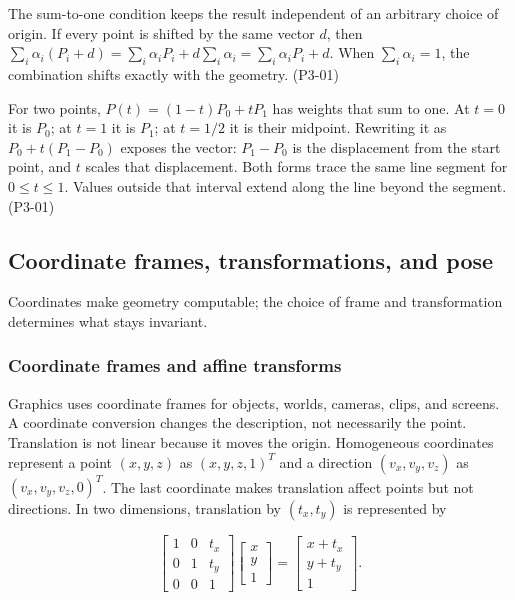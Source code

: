 The sum-to-one condition keeps the result independent of an arbitrary choice of origin. If every point is shifted by the same vector \(d\), then \(\sum_i\alpha_i(P_i+d)=\sum_i\alpha_iP_i+d\sum_i\alpha_i=\sum_i\alpha_iP_i+d\). When \(\sum_i\alpha_i=1\), the combination shifts exactly with the geometry. (P3-01)

For two points, \(P(t)=(1-t)P_0+tP_1\) has weights that sum to one. At \(t=0\) it is \(P_0\); at \(t=1\) it is \(P_1\); at \(t=1/2\) it is their midpoint. Rewriting it as \(P_0+t(P_1-P_0)\) exposes the vector: \(P_1-P_0\) is the displacement from the start point, and \(t\) scales that displacement. Both forms trace the same line segment for \(0\leq t\leq1\). Values outside that interval extend along the line beyond the segment. (P3-01)

\subsection{Coordinate frames, transformations, and pose}\label{coordinate-frames-transformations-and-pose}

Coordinates make geometry computable; the choice of frame and transformation determines what stays invariant.

\subsubsection{Coordinate frames and affine transforms}\label{coordinate-frames-and-affine-transforms}

Graphics uses coordinate frames for objects, worlds, cameras, clips, and screens. A coordinate conversion changes the description, not necessarily the point. Translation is not linear because it moves the origin. Homogeneous coordinates represent a point \((x,y,z)\) as \((x,y,z,1)^T\) and a direction \((v_x,v_y,v_z)\) as \((v_x,v_y,v_z,0)^T\). The last coordinate makes translation affect points but not directions. In two dimensions, translation by \((t_x,t_y)\) is represented by

\[
\begin{bmatrix}1&0&t_x\\0&1&t_y\\0&0&1\end{bmatrix}
\begin{bmatrix}x\\y\\1\end{bmatrix}
=\begin{bmatrix}x+t_x\\y+t_y\\1\end{bmatrix}.
\]

